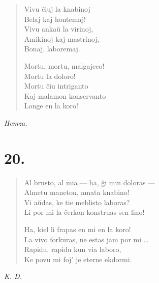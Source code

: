 \begin{verse}
\pstars

\begin{patverse} \vin \vin
Vivu ĉiuj la knabinoj\\
Belaj kaj hontemaj!\\
Vivu ankaŭ la virinoj,\\
Amikinoj kaj mastrinoj,\\
Bonaj, laboremaj.
\end{patverse}

\pstars

\begin{patverse} \vin \vin
Mortu, mortu, malgajeco!\\
Mortu la doloro!\\
Mortu ĉiu intriganto\\
Kaj malamon konservanto\\
Longe en la koro!
\end{patverse}

\end{verse}

\begin{flushright}
\it Hemza. 
\end{flushright}

\begin{center}
\end{center}


\section*{20.}

{\centering{}\par}

\begin{verse}
Al brusto, al mia --- ha, ĝi min doloras --- \\
  \vin   Almetu maneton, amata knabino!\\
Vi aŭdas, ke tie meblisto laboras?\\
  \vin   Li por mi la ĉerkon konstruas sen fino!

\pstars

Ha, kiel li frapas en mi en la koro!\\
\vin     La vivo forkuras, ne estas jam por mi \ldots{}\\
Rapidu, rapidu kun via laboro,\\
  \vin   Ke povu mi foj' je eterne ekdormi.
\end{verse}

\begin{flushright}
\it K. D. 
\end{flushright}

\begin{center}
\end{center}
\titlespacing*{\chapter}{0pt}{0pt}{0pt}
